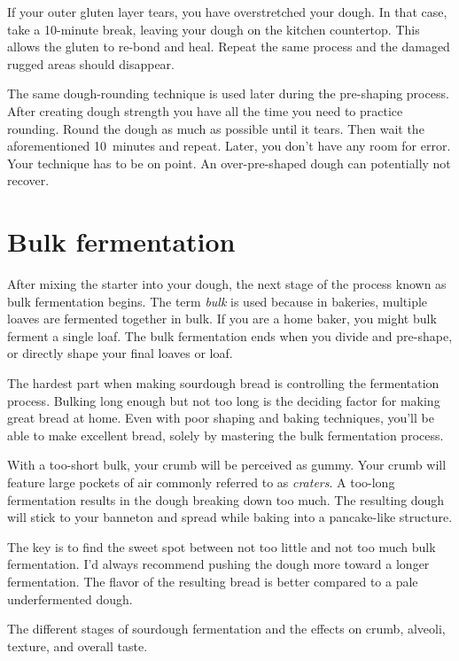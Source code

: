 If your outer gluten layer tears, you have overstretched your dough. In
that case, take a 10-minute break, leaving your dough on the kitchen countertop.
This allows the gluten to re-bond and heal. Repeat the same process
and the damaged rugged areas should disappear.

The same dough-rounding technique is used later during
the pre-shaping process. After creating dough strength you
have all the time you need to practice rounding. Round the dough
as much as possible until it tears. Then wait the aforementioned 10~minutes and repeat.
Later, you don't have any room for error. Your technique has to be on point.
An over-pre-shaped dough can potentially not recover.

\section{Bulk fermentation}%
\label{section:bulk-fermentation}

After mixing the starter into your dough, the next stage of
the process known as bulk fermentation begins. The term
\emph{bulk} is used because in bakeries, multiple loaves are fermented
together in bulk. If you are a home baker, you might bulk
ferment a single loaf. The bulk fermentation ends when you
divide and pre-shape, or directly shape your final loaves or loaf.

The hardest part when making sourdough bread is controlling
the fermentation process. Bulking long enough but not too
long is the deciding factor for making great bread at home.
Even with poor shaping and baking techniques, you'll be able
to make excellent bread, solely by mastering the bulk
fermentation process.

With a too-short bulk, your crumb will be
perceived as gummy. Your crumb will feature large pockets of
air commonly referred to as \emph{craters}. A too-long fermentation
results in the dough breaking down too much. The resulting
dough will stick to your banneton and spread while baking
into a pancake-like structure.

The key is to find the sweet spot between not too little
and not too much bulk fermentation. I'd always recommend pushing
the dough more toward a longer fermentation. The
flavor of the resulting bread is better compared to a pale
underfermented dough.

\begin{table}[!htb]
    \begin{center}
        
        \caption[Stages of sourdough fermentation]{The different stages of
            sourdough fermentation and the effects on crumb, alveoli, texture,
            and overall taste.}
    \end{center}
\end{table}

